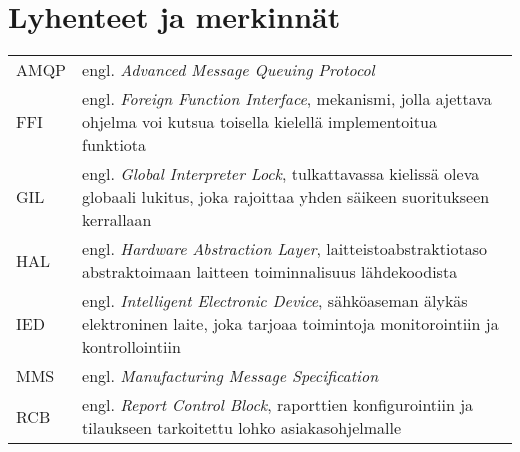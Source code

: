 \chapter*{Lyhenteet ja merkinnät}
\label{ch:lyhenteetjamerkinnat}

\begin{tabular}[h]{@{} p{} p{} @{}}
	AMQP & engl. \emph{Advanced Message Queuing Protocol} \\
	FFI & engl. \emph{Foreign Function Interface}, mekanismi, jolla ajettava ohjelma voi kutsua toisella kielellä implementoitua funktiota\\
	GIL & engl. \emph{Global Interpreter Lock}, tulkattavassa kielissä oleva globaali lukitus, joka rajoittaa yhden säikeen suoritukseen kerrallaan \\
	HAL & engl. \emph{Hardware Abstraction Layer}, laitteistoabstraktiotaso abstraktoimaan laitteen toiminnalisuus lähdekoodista \\
	IED & engl. \emph{Intelligent Electronic Device}, sähköaseman älykäs elektroninen laite, joka tarjoaa toimintoja monitorointiin ja kontrollointiin \\
	MMS & engl. \emph{Manufacturing Message Specification} \\
	RCB & engl. \emph{Report Control Block}, raporttien konfigurointiin ja tilaukseen tarkoitettu lohko asiakasohjelmalle \\
\end{tabular}